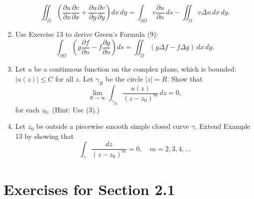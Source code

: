 \documentclass[12pt]{article}
\theoremstyle{definition} %
\theoremstyle{plain} %
\begin{document}
\begin{enumerate}
    \[
    \iint_\Omega \left( \frac{\partial u}{\partial x} \frac{\partial v}{\partial x} + \frac{\partial u}{\partial y} \frac{\partial v}{\partial y} \right) dx \, dy = \int_{\partial \Omega} v \frac{\partial u}{\partial n} \, ds - \iint_\Omega v \Delta u \, dx \, dy.
    \]
    \item Use Exercise 13 to derive Green’s Formula (9):
    \[
    \int_{\partial \Omega} \left( g \frac{\partial f}{\partial n} - f \frac{\partial g}{\partial n} \right) ds = \iint_\Omega (g \Delta f - f \Delta g) \, dx \, dy.
    \]
    \item Let $u$ be a continuous function on the complex plane, which is bounded: $|u(z)| \leq C$ for all $z$. Let $\gamma_R$ be the circle $|z| = R$. Show that
    \[
    \lim_{R \to \infty} \int_{\gamma_R} \frac{u(z)}{(z - z_0)^m} \, dz = 0,
    \]
    for each $z_0$. (Hint: Use (3).)
    \item Let $z_0$ be outside a piecewise smooth simple closed curve $\gamma$. Extend Example 13 by showing that
    \[
    \int_\gamma \frac{dz}{(z - z_0)^m} = 0, \quad m = 2, 3, 4, \ldots
    \]
\end{enumerate}

\section*{Exercises for Section 2.1}
\end{document}

